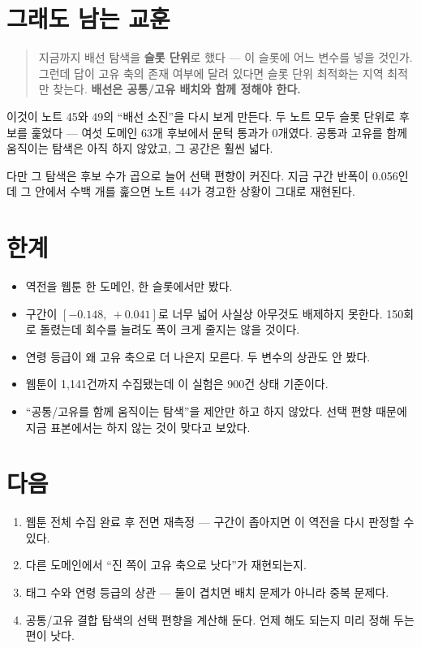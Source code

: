 \documentclass[10pt]{article}
\begin{document}
\section{그래도 남는 교훈}

\begin{quote}\fontsize{9.5}{11.5}\selectfont
지금까지 배선 탐색을 \textbf{슬롯 단위}로 했다 --- 이 슬롯에 어느 변수를 넣을
것인가. 그런데 답이 고유 축의 존재 여부에 달려 있다면 슬롯 단위 최적화는
지역 최적만 찾는다. \textbf{배선은 공통/고유 배치와 함께 정해야 한다.}
\end{quote}

이것이 노트 45와 49의 ``배선 소진''을 다시 보게 만든다. 두 노트 모두 슬롯
단위로 후보를 훑었다 --- 여섯 도메인 63개 후보에서 문턱 통과가 0개였다. 공통과
고유를 함께 움직이는 탐색은 아직 하지 않았고, 그 공간은 훨씬 넓다.

다만 그 탐색은 후보 수가 곱으로 늘어 선택 편향이 커진다. 지금 구간 반폭이
0.056인데 그 안에서 수백 개를 훑으면 노트 44가 경고한 상황이 그대로 재현된다.

\section{한계}

\begin{itemize}[leftmargin=1.1em,itemsep=0.15em]
\item 역전을 웹툰 한 도메인, 한 슬롯에서만 봤다.
\item 구간이 $[-0.148,\ +0.041]$로 너무 넓어 사실상 아무것도 배제하지 못한다.
      150회로 돌렸는데 회수를 늘려도 폭이 크게 줄지는 않을 것이다.
\item 연령 등급이 왜 고유 축으로 더 나은지 모른다. 두 변수의 상관도 안 봤다.
\item 웹툰이 1,141건까지 수집됐는데 이 실험은 900건 상태 기준이다.
\item ``공통/고유를 함께 움직이는 탐색''을 제안만 하고 하지 않았다. 선택 편향
      때문에 지금 표본에서는 하지 않는 것이 맞다고 보았다.
\end{itemize}

\section{다음}

\begin{enumerate}[leftmargin=1.3em,itemsep=0.15em]
\item 웹툰 전체 수집 완료 후 전면 재측정 --- 구간이 좁아지면 이 역전을 다시
      판정할 수 있다.
\item 다른 도메인에서 ``진 쪽이 고유 축으로 낫다''가 재현되는지.
\item 태그 수와 연령 등급의 상관 --- 둘이 겹치면 배치 문제가 아니라 중복 문제다.
\item 공통/고유 결합 탐색의 선택 편향을 계산해 둔다. 언제 해도 되는지 미리
      정해 두는 편이 낫다.
\end{enumerate}
\end{document}
